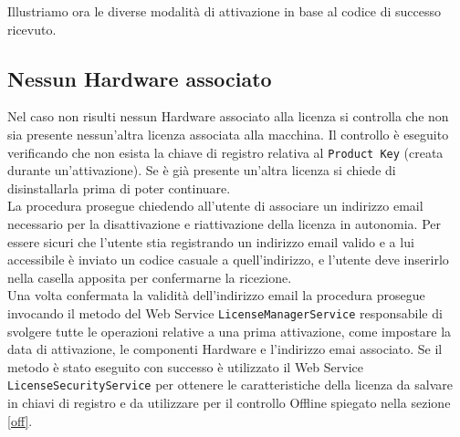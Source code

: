 Illustriamo ora le diverse modalità di attivazione in base al codice di successo ricevuto.


\subsection{Nessun Hardware associato}
\label{nha}

Nel caso non risulti nessun Hardware associato alla licenza si controlla che non sia presente nessun’altra licenza associata alla macchina. Il controllo è eseguito verificando che non esista la chiave di registro relativa al \texttt{Product Key} (creata durante un'attivazione). Se è già presente un’altra licenza si chiede di disinstallarla prima di poter continuare.
\\La procedura prosegue chiedendo all’utente di associare un indirizzo email necessario per la disattivazione e riattivazione della licenza in autonomia. 
Per essere sicuri che l’utente stia registrando un indirizzo email valido e a lui accessibile è inviato un codice casuale a quell’indirizzo, e l’utente deve inserirlo nella casella apposita per confermarne la ricezione. 
\\Una volta confermata la validità dell'indirizzo email la procedura prosegue invocando il metodo del Web Service \texttt{LicenseManagerService} responsabile di svolgere tutte le operazioni relative a una prima attivazione, come impostare la data di attivazione, le componenti Hardware e l'indirizzo emai associato. Se il metodo è stato eseguito con successo è utilizzato il Web Service \texttt{LicenseSecurityService} per ottenere le caratteristiche della licenza da salvare in chiavi di registro e da utilizzare per il controllo Offline spiegato nella sezione \ref{off}. 


